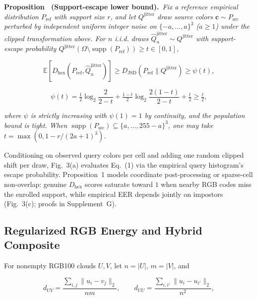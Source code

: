 \documentclass[10pt,journal,compsoc]{IEEEtran}
\newcounter{proposition}
\newenvironment{proposition}[1][]{\refstepcounter{proposition}\par\smallskip\noindent\textbf{Proposition \theproposition\ (#1).}\ }{\par\smallskip}
\newcommand{\Dhex}{D_{\mathrm{hex}}}
\begin{document}
\begin{proposition}[Support-escape lower bound]\label{prop:1}\normalfont \emph{Fix a reference empirical distribution $P_{\mathrm{ref}}$ with support size $r$, and let $Q^{\mathrm{jitter}}$ draw source colors $\mathbf c\sim P_{\mathrm{src}}$ perturbed by independent uniform integer noise on $\{-a,\ldots,a\}^3$ ($a\ge1$) under the clipped transformation above. For $n$ i.i.d. draws $\hat Q_n^{\mathrm{jitter}}\sim Q^{\mathrm{jitter}}$ with support-escape probability $Q^{\mathrm{jitter}}(\Omega\setminus\operatorname{supp}(P_{\mathrm{ref}}))\ge t\in[0,1]$,}


\begin{equation*}
\mathbb E[\Dhex{}(P_{\mathrm{ref}},\hat Q_n^{\mathrm{jitter}})]\ge D_{\mathrm{JSD}}(P_{\mathrm{ref}}\|Q^{\mathrm{jitter}})\ge\psi(t),
\end{equation*}

\begin{equation}
\psi(t)=\tfrac12\log_2\frac2{2-t}+\tfrac{1-t}{2}\log_2\frac{2(1-t)}{2-t}+\tfrac t2\ge\tfrac t2,
\end{equation}

\noindent \emph{where $\psi$ is strictly increasing with $\psi(1)=1$ by continuity, and the population bound is tight. When $\operatorname{supp}(P_{\mathrm{src}})\subseteq\{a,\ldots,255-a\}^3$, one may take $t=\max(0,1-r/(2a+1)^3)$.}


\end{proposition}

Conditioning on observed query colors per cell and adding one random clipped shift per draw, Fig.~3(a) evaluates Eq.~(1) via the empirical query histogram's escape probability. Proposition~1 models coordinate post-processing or sparse-cell non-overlap: genuine $D_{\mathrm{hex}}$ scores saturate toward $1$ when nearby RGB codes miss the enrolled support, while empirical EER depends jointly on impostors (Fig.~3(c); proofs in Supplement~G).

\subsection{Regularized RGB Energy and Hybrid Composite}

For nonempty RGB100 clouds $U,V$, let $n=|U|$, $m=|V|$, and


\begin{equation*}
d_{UV}=\frac{\sum_{i,j}\|u_i-v_j\|_2}{nm},\qquad d_{UU}=\frac{\sum_{i,i'}\|u_i-u_{i'}\|_2}{n^2},
\end{equation*}
\end{document}
